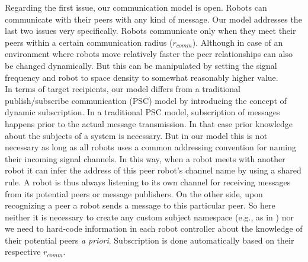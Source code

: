 Regarding the first issue, our communication model is open. Robots can communicate with their peers with any kind of message. Our model addresses the last two issues very specifically. Robots communicate only when they meet their peers within a certain communication radius ($r_{comm}$). Although in case of an environment where robots move relatively faster the peer relationships can also be changed dynamically. But this can be manipulated by setting the signal frequency and robot to space density to somewhat reasonably higher value.\\ 
In terms of target recipients, our model differs from a traditional publish/subscribe communication (PSC) model by introducing the concept of dynamic subscription. In a traditional PSC model, subscription of messages happens prior to the actual message transmission. In that case prior knowledge about the subjects of a system is necessary. But in our model this is not necessary as long as all robots uses a common addressing convention for naming their incoming signal channels. In this way, when a robot meets with another robot it can infer the address of this peer robot's channel name by using a shared rule. A robot is thus always listening to its own channel for receiving messages from its potential peers or message publishers. On the other side, upon recognizing a peer a robot sends a message to this particular peer. So here neither it is necessary to create any custom subject namespace (e.g.,  as in ) nor we need to hard-code information in each robot controller about the knowledge of their potential peers {\em a priori}. Subscription is done automatically based on their respective $r_{comm}$.
%
